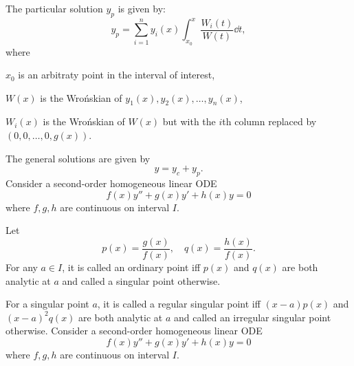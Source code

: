 \documentclass[a4paper,12pt]{report}
\begin{document}
The particular solution $y_p$ is given by:
\[y_p=\sum_{i=1}^ny_i(x)\int_{x_0}^x\frac{W_i(t)}{W(t)}\dd{t},\]
where
\bit
\item $x_0$ is an arbitraty point in the interval of interest,
\item $W(x)$ is the Wrońskian of $y_1(x),y_2(x),\ldots,y_n(x)$,
\item $W_i(x)$ is the Wrońskian of $W(x)$ but with the $i$th column replaced by $(0,0,\ldots,0,g(x))$.
\eit
\item The general solutions are given by
\[y=y_c+y_p.\]
\een
{}
Consider a second-order homogeneous linear ODE
\[f(x)y''+g(x)y'+h(x)y=0\]
where $f,g,h$ are continuous on interval $I$.

Let
\[p(x)=\frac{g(x)}{f(x)},\quad q(x)=\frac{h(x)}{f(x)}.\]
For any $a\in I$, it is called an ordinary point iff $p(x)$ and $q(x)$ are both analytic at $a$ and called a singular point otherwise.

For a singular point $a$, it is called a regular singular point iff $(x-a)p(x)$ and $(x-a)^2q(x)$ are both analytic at $a$ and called an irregular singular point otherwise.
Consider a second-order homogeneous linear ODE
\[f(x)y''+g(x)y'+h(x)y=0\]
where $f,g,h$ are continuous on interval $I$.
\end{document}
